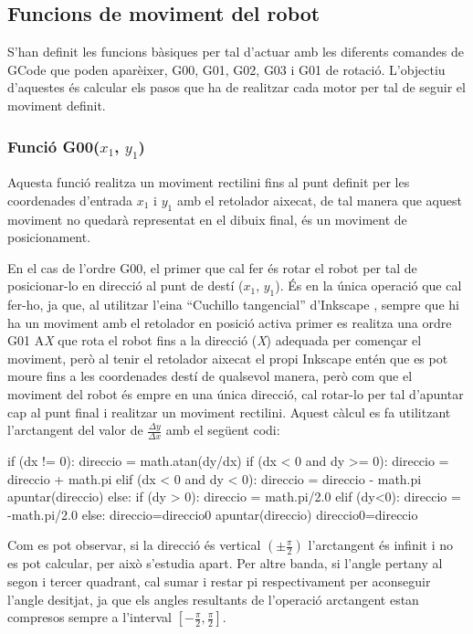 \subsection{Funcions de moviment del robot}
S’han definit les funcions bàsiques per tal d’actuar amb les diferents comandes de GCode que poden aparèixer, G00, G01, G02, G03 i G01 de rotació. L’objectiu d’aquestes és calcular els pasos que ha de realitzar cada motor per tal de seguir el moviment definit. 

\subsubsection{Funció G00($x_{1}$, $y_{1}$)}

Aquesta funció realitza un moviment rectilini fins al punt definit per les coordenades d’entrada $x_{1}$ i $y_{1}$ amb el retolador aixecat, de tal manera que aquest moviment no quedarà representat en el dibuix final, és un moviment de posicionament.

En el cas de l’ordre G00, el primer que cal fer és rotar el robot per tal de posicionar-lo en direcció al punt de destí ($x_{1}$, $y_{1}$). És en la única operació que cal fer-ho, ja que, al utilitzar l’eina “Cuchillo tangencial” d’Inkscape , sempre que hi ha un moviment amb el retolador en posició activa primer es realitza una ordre G01 A\emph{X} que rota el robot fins a la direcció (\emph{X}) adequada per començar el moviment, però al tenir el retolador aixecat el propi Inkscape entén que es pot moure fins a les coordenades destí de qualsevol manera, però com que el moviment del robot és empre en una única direcció, cal rotar-lo per tal d'apuntar cap al punt final i realitzar un moviment rectilini. Aquest càlcul es fa utilitzant l’arctangent del valor de $\frac{\Delta y }{\Delta x}$ amb el següent codi:
\begin{python}
	if (dx != 0):
		direccio = math.atan(dy/dx) 
		if (dx < 0 and dy >= 0):
			direccio = direccio + math.pi 
		elif (dx < 0 and dy < 0):
			direccio = direccio - math.pi
		apuntar(direccio) 
	else:
		if (dy > 0):
			direccio = math.pi/2.0 
		elif (dy<0):
			direccio = -math.pi/2.0 
		else:
			direccio=direccio0
		apuntar(direccio) 
	direccio0=direccio
\end{python}

Com es pot observar, si la direcció és vertical $(\pm\frac{\pi}{2})$  l’arctangent és infinit i no es pot calcular, per això s’estudia apart. Per altre banda, si l’angle pertany al segon i tercer quadrant, cal sumar i restar pi respectivament per aconseguir l’angle desitjat, ja que els angles resultants de l’operació arctangent estan compresos sempre a l’interval $[-\frac{\pi}{2}, \frac{\pi}{2}]$.

